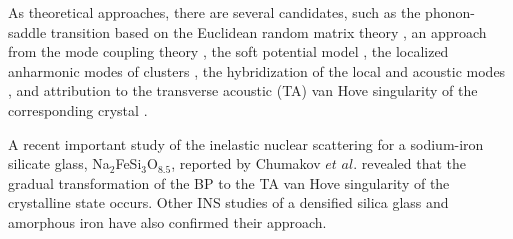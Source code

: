 \documentclass[%
 reprint,
superscriptaddress,
 amsmath,amssymb,
 aps,
prb,
]{revtex4-1}
\begin{document}
As theoretical approaches, there are several candidates, such as the phonon-saddle transition \cite{Grigera2003} based on the Euclidean random matrix theory \cite{Grigera2002}, an approach from the mode coupling theory \cite{Gotze2000}, the soft potential model \cite{Parshin1993, Parshin2003, Parshin2007}, the localized anharmonic modes of clusters \cite{Duval1990}, the hybridization of the local and acoustic modes \cite{Nakayama1998PRL, Klinger2001}, and attribution to the transverse acoustic (TA) van Hove singularity of the corresponding crystal \cite{Schirmacher1998, Taraskin1999, Taraskin2001, Pilla2004}.

A recent important study of the inelastic nuclear scattering for a sodium-iron silicate glass, Na$_2$FeSi$_3$O$_{8.5}$, reported by Chumakov $et$ $al$.\cite{Chumakov2011} revealed that the gradual transformation of the BP to the TA van Hove singularity of the crystalline state occurs.
Other INS studies of a densified silica glass\cite{Chumakov2014} and amorphous iron\cite{Chumakov2015} have also confirmed their approach.
\end{document}
